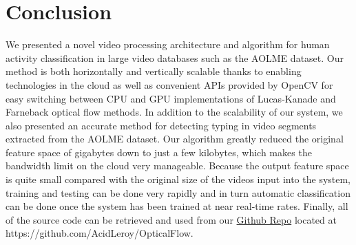 \section{Conclusion}
We presented a novel video processing architecture and algorithm for human
activity classification in large video databases such as the AOLME dataset. Our
method is both horizontally and vertically scalable thanks to enabling
technologies in the cloud as well as convenient APIs provided by OpenCV for easy
switching between CPU and GPU implementations of Lucas-Kanade and Farneback
optical flow methods. In addition to the scalability of our system, we also
presented an accurate method for detecting typing in video segments extracted
from the AOLME dataset. Our algorithm greatly reduced the original feature space
of gigabytes down to just a few kilobytes, which makes the bandwidth limit on
the cloud very manageable. Because the output feature space is quite small
compared with the original size of the videos input into the system, training
and testing can be done very rapidly and in turn automatic classification can be
done once the system has been trained at near real-time rates. Finally, all of
the source code can be retrieved and used from our
\href{https://github.com/AcidLeroy/OpticalFlow}{Github Repo} located at
https://github.com/AcidLeroy/OpticalFlow.
